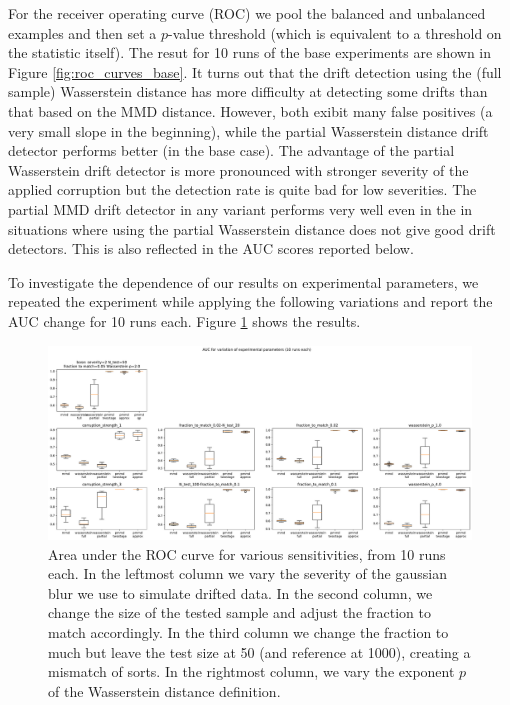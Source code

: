 \documentclass[a4paper,twoside,10pt]{article}
\theoremstyle{plain}
\theoremstyle{remark}
\begin{document}
For the receiver operating curve (ROC) we pool the balanced and unbalanced examples and then set a $p$-value threshold (which is equivalent to a threshold on the statistic itself). The resut for 10 runs of the base experiments are shown in Figure \ref{fig:roc_curves_base}.
It turns out that the drift detection using the (full sample) Wasserstein distance has more difficulty at detecting some drifts than that based on the MMD distance. However, both exibit many false positives (a very small slope in the beginning), while the partial Wasserstein distance drift detector performs better (in the base case). The advantage of the partial Wasserstein drift detector is more pronounced with stronger severity of the applied corruption but the detection rate is quite bad for low severities. The partial MMD drift detector in any variant performs very well even in the in situations where using the partial Wasserstein distance does not give good drift detectors. This is also reflected in the AUC scores reported below.

To investigate the dependence of our results on experimental parameters, we repeated the experiment while applying the following variations and report the AUC change for 10 runs each. Figure \ref{fig:auc_sensitivities} shows the results.

\begin{figure}
\includegraphics[width=15cm]{experiment/v1/auc_for_sensitivities.pdf}
\caption{\label{fig:auc_sensitivities} Area under the ROC curve for various sensitivities, from 10 runs each. In the leftmost column we vary the severity of the gaussian blur we use to simulate drifted data. In the second column, we change the size of the tested sample and adjust the fraction to match accordingly. In the third column we change the fraction to much but leave the test size at 50 (and reference at 1000), creating a mismatch of sorts. In the rightmost column, we vary the exponent $p$ of the Wasserstein distance definition.}
\end{figure}
\end{document}
